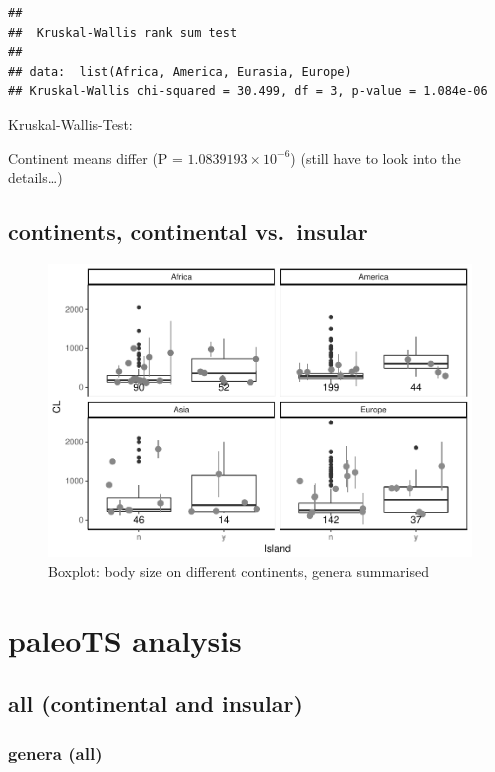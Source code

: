 \documentclass[]{article}
\begin{document}
\begin{verbatim}
## 
##  Kruskal-Wallis rank sum test
## 
## data:  list(Africa, America, Eurasia, Europe)
## Kruskal-Wallis chi-squared = 30.499, df = 3, p-value = 1.084e-06
\end{verbatim}

Kruskal-Wallis-Test:

Continent means differ (P = \(1.0839193\times 10^{-6}\)) (still have to
look into the details\ldots{})

\newpage

\subsection{continents, continental
vs.~insular}\label{continents-continental-vs.insular}

\begin{figure}[htbp]
\centering
\includegraphics{MA_JJ_files/figure-latex/BPConCI-1.pdf}
\caption{Boxplot: body size on different continents, genera summarised}
\end{figure}

\newpage

\section{paleoTS analysis}\label{paleots-analysis}

\subsection{all (continental and
insular)}\label{all-continental-and-insular}

\subsubsection{genera (all)}\label{genera-all}
\end{document}
